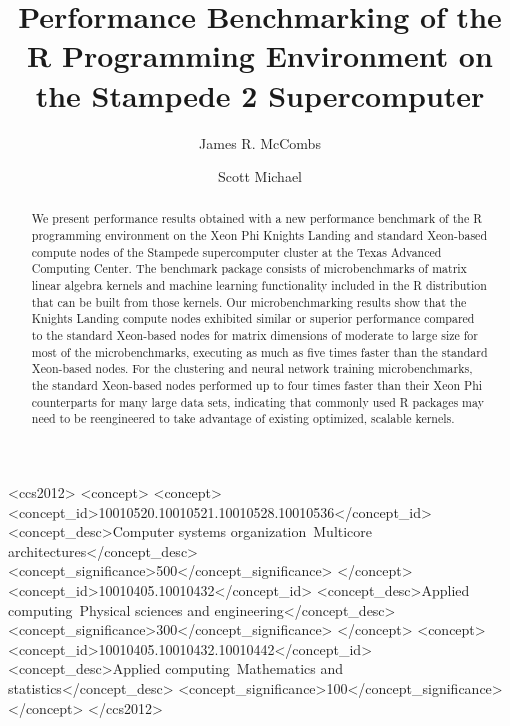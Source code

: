 \documentclass[sigconf]{acmart}
\begin{document}
\title{Performance Benchmarking of the R Programming Environment on the Stampede 2 Supercomputer}


\author{James R. McCombs}

\author{Scott Michael}

\renewcommand{\shortauthors}{J.R. McCombs et al.}


\begin{abstract}

We present performance results obtained with a new  performance benchmark of the R
programming environment on the Xeon Phi Knights Landing and standard Xeon-based compute
nodes of the Stampede supercomputer cluster at the Texas Advanced Computing Center. The
benchmark package consists of microbenchmarks of matrix linear algebra kernels and machine
learning functionality included in the R distribution that can be built from those
kernels. Our microbenchmarking results show that the Knights Landing compute nodes
exhibited similar or superior performance compared to the standard Xeon-based nodes for
matrix dimensions of moderate to large size for most of the microbenchmarks, executing as
much as five times faster than the standard Xeon-based nodes. For the clustering and
neural network training microbenchmarks, the standard Xeon-based nodes performed up to
four times faster than their Xeon Phi counterparts for many large data sets, indicating
that commonly used R packages may need to be reengineered to take advantage of existing
optimized, scalable kernels.

\end{abstract}

%
%
\begin{CCSXML}
<ccs2012>
<concept>
<concept>
<concept_id>10010520.10010521.10010528.10010536</concept_id>
<concept_desc>Computer systems organization~Multicore architectures</concept_desc>
<concept_significance>500</concept_significance>
</concept>
<concept_id>10010405.10010432</concept_id>
<concept_desc>Applied computing~Physical sciences and engineering</concept_desc>
<concept_significance>300</concept_significance>
</concept>
<concept>
<concept_id>10010405.10010432.10010442</concept_id>
<concept_desc>Applied computing~Mathematics and statistics</concept_desc>
<concept_significance>100</concept_significance>
</concept>
</ccs2012>
\end{CCSXML}
\end{document}
